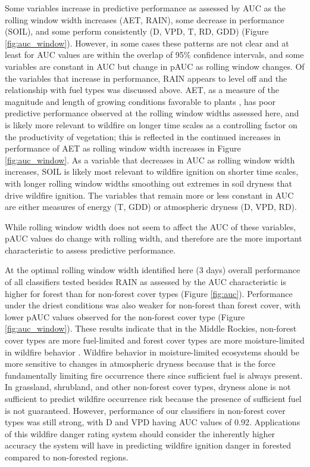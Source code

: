 \documentclass[11p]{article}
\begin{document}
Some variables increase in predictive performance as assessed by AUC as the rolling window width increases (AET, RAIN), some decrease in performance (SOIL), and some perform consistently (D, VPD, T, RD, GDD) (Figure \ref{fig:auc_window}). However, in some cases these patterns are not clear and at least for AUC values are within the overlap of 95\% confidence intervals, and some variables are constant in AUC but change in pAUC as rolling window changes. Of the variables that increase in performance, RAIN appears to level off and the relationship with fuel types was discussed above. AET, as a measure of the magnitude and length of growing conditions favorable to plants \citep{stephensonActualEvapotranspirationDeficit1998}, has poor predictive performance observed at the rolling window widths assessed here, and is likely more relevant to wildfire on longer time scales as a controlling factor on the productivity of vegetation; this is reflected in the continued increases in performance of AET as rolling window width increases in Figure \ref{fig:auc_window}. As a variable that decreases in AUC as rolling window width increases, SOIL is likely most relevant to wildfire ignition on shorter time scales, with longer rolling window widths smoothing out extremes in soil dryness that drive wildfire ignition. The variables that remain more or less constant in AUC are either measures of energy (T, GDD) or atmospheric dryness (D, VPD, RD). %

While rolling window width does not seem to affect the AUC of these variables, pAUC values do change with rolling width, and therefore are the more important characteristic to assess predictive performance.


At the optimal rolling window width identified here (3 days) overall performance of all classifiers tested besides RAIN as assessed by the AUC characteristic is higher for forest than for non-forest cover types (Figure \ref{fig:auc}). Performance under the driest conditions was also weaker for non-forest than forest cover, with lower pAUC values observed for the non-forest cover type (Figure \ref{fig:auc_window}). These results indicate that in the Middle Rockies, non-forest cover types are more fuel-limited and forest cover types are more moisture-limited in wildfire behavior \citep{meynEnvironmentalDriversLarge2007,littellClimateChangeFuture2018}. Wildfire behavior in moisture-limited ecosystems should be more sensitive to changes in atmospheric dryness because that is the force fundamentally limiting fire occurrence there since sufficient fuel is always present. In grassland, shrubland, and other non-forest cover types, dryness alone is not sufficient to predict wildfire occurrence risk because the presence of sufficient fuel is not guaranteed. However, performance of our classifiers in non-forest cover types was still strong, with D and VPD having AUC values of 0.92. Applications of this wildfire danger rating system should consider the inherently higher accuracy the system will have in predicting wildfire ignition danger in forested compared to non-forested regions.  
\end{document}

